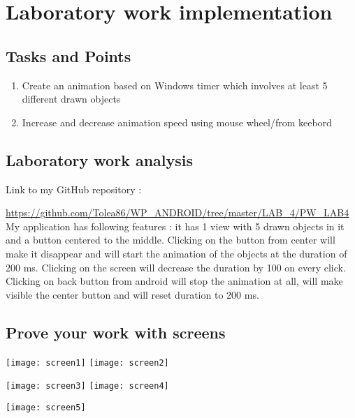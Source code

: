 \section{Laboratory work implementation}

\subsection{Tasks and Points}

\begin{enumerate}

\item Create an animation based on Windows timer which involves at least 5 different drawn objects
\item Increase and decrease animation speed using mouse wheel/from keebord

\end{enumerate}
\subsection{Laboratory work analysis}

Link to my GitHub repository : 

\url{https://github.com/Tolea86/WP_ANDROID/tree/master/LAB_4/PW_LAB4}\\

My application has following features : it has 1 view with 5 drawn objects in it and a button centered to the middle. Clicking on the button from center will make it disappear and will start the animation of the objects at the duration of 200 ms. Clicking on the screen will decrease the duration by 100 on every click. Clicking on back button from android will stop the animation at all, will make visible the center button and will reset duration to 200 ms.

\subsection{Prove your work with screens}

\texttt{[image: screen1]}
\texttt{[image: screen2]}

\texttt{[image: screen3]}
\texttt{[image: screen4]}

\texttt{[image: screen5]}

\clearpage